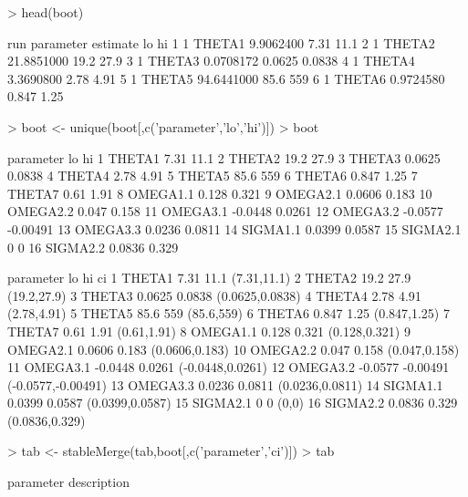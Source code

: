 \begin{Schunk}
\begin{Sinput}
> head(boot)
\end{Sinput}
\begin{Soutput}
  run parameter   estimate     lo     hi
1   1    THETA1  9.9062400   7.31   11.1
2   1    THETA2 21.8851000   19.2   27.9
3   1    THETA3  0.0708172 0.0625 0.0838
4   1    THETA4  3.3690800   2.78   4.91
5   1    THETA5 94.6441000   85.6    559
6   1    THETA6  0.9724580  0.847   1.25
\end{Soutput}
\begin{Sinput}
> boot <- unique(boot[,c('parameter','lo','hi')])
> boot
\end{Sinput}
\begin{Soutput}
   parameter      lo       hi
1     THETA1    7.31     11.1
2     THETA2    19.2     27.9
3     THETA3  0.0625   0.0838
4     THETA4    2.78     4.91
5     THETA5    85.6      559
6     THETA6   0.847     1.25
7     THETA7    0.61     1.91
8   OMEGA1.1   0.128    0.321
9   OMEGA2.1  0.0606    0.183
10  OMEGA2.2   0.047    0.158
11  OMEGA3.1 -0.0448   0.0261
12  OMEGA3.2 -0.0577 -0.00491
13  OMEGA3.3  0.0236   0.0811
14  SIGMA1.1  0.0399   0.0587
15  SIGMA2.1       0        0
16  SIGMA2.2  0.0836    0.329
\end{Soutput}
\begin{Soutput}
   parameter      lo       hi                 ci
1     THETA1    7.31     11.1        (7.31,11.1)
2     THETA2    19.2     27.9        (19.2,27.9)
3     THETA3  0.0625   0.0838    (0.0625,0.0838)
4     THETA4    2.78     4.91        (2.78,4.91)
5     THETA5    85.6      559         (85.6,559)
6     THETA6   0.847     1.25       (0.847,1.25)
7     THETA7    0.61     1.91        (0.61,1.91)
8   OMEGA1.1   0.128    0.321      (0.128,0.321)
9   OMEGA2.1  0.0606    0.183     (0.0606,0.183)
10  OMEGA2.2   0.047    0.158      (0.047,0.158)
11  OMEGA3.1 -0.0448   0.0261   (-0.0448,0.0261)
12  OMEGA3.2 -0.0577 -0.00491 (-0.0577,-0.00491)
13  OMEGA3.3  0.0236   0.0811    (0.0236,0.0811)
14  SIGMA1.1  0.0399   0.0587    (0.0399,0.0587)
15  SIGMA2.1       0        0              (0,0)
16  SIGMA2.2  0.0836    0.329     (0.0836,0.329)
\end{Soutput}
\begin{Sinput}
> tab <- stableMerge(tab,boot[,c('parameter','ci')])
> tab
\end{Sinput}
\begin{Soutput}
   parameter                                   description

\end{Soutput}
\end{Schunk}
